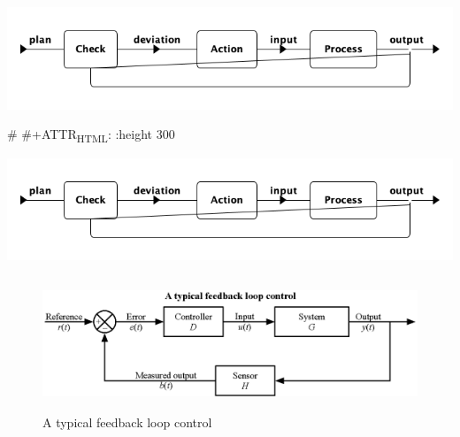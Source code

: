 \documentclass{article}
\begin{document}
\begin{center}
\includegraphics[width=.9\linewidth]{Figures/system_feedback_loop.png}
\end{center}

\# \#+ATTR\textsubscript{HTML}: :height 300

\begin{center}
\includegraphics[width=.9\linewidth]{Figures/system_feedback_loop.png}
\end{center}






\begin{figure}[htbp]
\centering
\includegraphics[height=150]{./Figures/A_typical_feedback_loop_control.eps}
\caption{\label{fig:org1afb01f}A typical feedback loop control}
\end{figure}
\end{document}
